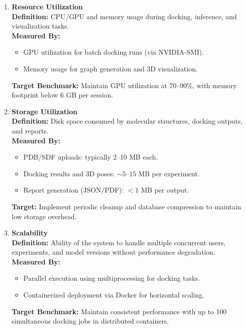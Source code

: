 \documentclass[12pt,a4]{report}
\begin{document}
\begin{enumerate}[label=\textbf{\Alph*.}, leftmargin=1.2cm]
    \vspace{0.4cm}
    \item \textbf{Resource Utilization} \\
    \hspace{0.3in}
    \textbf{Definition:} CPU/GPU and memory usage during docking, inference, and visualization tasks. \\
    \hspace{0.3in}
    \textbf{Measured By:}
    \begin{itemize}
        \item GPU utilization for batch docking runs (via NVIDIA-SMI).
        \item Memory usage for graph generation and 3D visualization.
    \end{itemize}
    \hspace{0.3in}
    \textbf{Target Benchmark:} Maintain GPU utilization at 70–90\%, with memory footprint below 6 GB per session.

    \vspace{0.4cm}
    \item \textbf{Storage Utilization} \\
    \hspace{0.3in}
    \textbf{Definition:} Disk space consumed by molecular structures, docking outputs, and reports. \\
    \hspace{0.3in}
    \textbf{Measured By:}
    \begin{itemize}
        \item PDB/SDF uploads: typically 2–10 MB each.
        \item Docking results and 3D poses: \(\sim 5–15\) MB per experiment.
        \item Report generation (JSON/PDF): \(<1\) MB per output.
    \end{itemize}
    \hspace{0.3in}
    \textbf{Target:} Implement periodic cleanup and database compression to maintain low storage overhead.

    \vspace{0.4cm}
    \item \textbf{Scalability} \\
    \hspace{0.3in}
    \textbf{Definition:} Ability of the system to handle multiple concurrent users, experiments, and model versions without performance degradation. \\
    \hspace{0.3in}
    \textbf{Measured By:}
    \begin{itemize}
        \item Parallel execution using multiprocessing for docking tasks.
        \item Containerized deployment via Docker for horizontal scaling.
    \end{itemize}
    \hspace{0.3in}
    \textbf{Target Benchmark:} Maintain consistent performance with up to 100 simultaneous docking jobs in distributed containers.


\end{enumerate}
\end{document}
